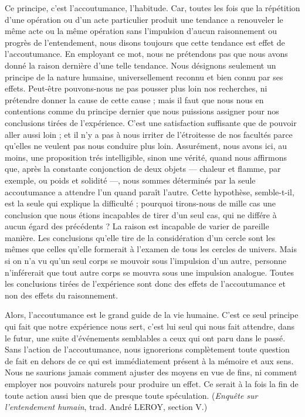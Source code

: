 Ce principe, c’est l'accoutumance, l’habitude. Car,
toutes les fois que la répétition d’une opération ou d’un
acte particulier produit une tendance a renouveler le
même acte ou la même opération sans l’impulsion d’aucun
raisonnement ou progrès de l’entendement, nous disons
toujours que cette tendance est effet de l’accoutumance.
En employant ce mot, nous ne prétendons pas que nous
avons donné la raison dernière d’une telle tendance.
Nous désignons seulement un principe de la nature
humaine, universellement reconnu et bien connu par ses
effets. Peut-être pouvons-nous ne pas pousser plus loin
nos recherches, ni prétendre donner la cause de cette
cause ; mais il faut que nous nous en contentions comme
du principe dernier que nous puissions assigner pour nos
conclusions tirées de l’expérience. C’est une satisfaction
suffisante que de pouvoir aller aussi loin ; et il n’y a pas
à nous irriter de l’étroitesse de nos facultés parce qu’elles
ne veulent pas nous conduire plus loin. Assurément, nous
avons ici, au moins, une proposition trés intelligible,
sinon une vérité, quand nous affirmons que, après la
constante conjonction de deux objets — chaleur et flamme,
par exemple, ou poids et solidité —, nous sommes déterminés
par la seule accoutumance a attendre l’un quand
paraît l’autre. Cette hypothèse, semble-t-il, est la seule
qui explique la difficulté ; pourquoi tirons-nous de mille
cas une conclusion que nous étions incapables de tirer
d’un seul cas, qui ne différe à aucun égard des précédents ?
La raison est incapable de varier de pareille manière. Les
conclusions qu’elle tire de la considération d’un cercle
sont les mêmes que celles qu’elle formerait à l’examen de
tous les cercles de univers. Mais si on n’a vu qu’un seul
corps se mouvoir sous l’impulsion d’un autre, personne
n’inférerait que tout autre corps se mouvra sous une
impulsion analogue. Toutes les conclusions tirées de
l'expérience sont donc des effets de l'accoutumance et
non des effets du raisonnement.

Alors, l'accoutumance est le grand guide de la vie
humaine. C’est ce seul principe qui fait que notre expérience
nous sert, c’est lui seul qui nous fait attendre, dans
le futur, une suite d’événements semblables a ceux qui ont
paru dans le passé. Sans l’action de l’accoutumance, nous
ignorerions complètement toute question de fait en dehors
de ce qui est immédiatement présent à la mémoire et aux
sens. Nous ne saurions jamais comment ajuster des moyens
en vue de fins, ni comment employer nos pouvoirs naturels
pour produire un effet. Ce serait à la fois la fin de toute
action aussi bien que de presque toute spéculation. ({\it Enquête
sur l’entendement humain}, trad. André L{\footnotesize EROY}, section V.)

